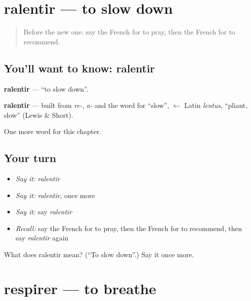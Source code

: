 \section[ralentir]{ralentir — to slow down}

\label{lesson:FR-C151-ralentir}



\begin{quote}
Before the new one: say the French for to pray, then the French for to recommend.
\end{quote}

\subsection*{You'll want to know: ralentir}
\textbf{ralentir} — \textquotedblleft{}to slow down\textquotedblright{}.

\begin{cousinweb}
\textbf{ralentir} — built from \emph{re-}, \emph{a-} and the word for \textquotedblleft{}slow\textquotedblright{}, $\leftarrow$ Latin \emph{lentus}, \textquotedblleft{}pliant, slow\textquotedblright{} (Lewis \& Short).
\end{cousinweb}

\begin{grammarlens}[title={What you've built}]
One more word for this chapter.
\end{grammarlens}

\subsection*{Your turn}
\begin{itemize}
\raggedright
  \item \emph{Say it:} \emph{ralentir}
  \item \emph{Say it:} \emph{ralentir}, once more
  \item \emph{Say it:} say \emph{ralentir}
  \item \emph{Recall:} say the French for to pray, then the French for to recommend, then say \emph{ralentir} again
\end{itemize}

\begin{tcolorbox}[breakable,colback=teal!4,colframe=teal!35!black,title={Before you move on}]
What does ralentir mean? (\textquotedblleft{}To slow down\textquotedblright{}.) Say it once more.
\end{tcolorbox}
\section[respirer]{respirer — to breathe}

